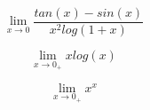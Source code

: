 \begin{subtask}
    \[\lim_{x\to 0}\frac{tan(x)-sin(x)}{x^2log(1+x)}\]
\end{subtask}
\begin{solution}
        
\end{solution}
    
\begin{minipage}[t]{0.49\textwidth}
    \begin{subtask}
        \[\lim_{x\to 0_+}xlog(x)\]
    \end{subtask}
    \begin{solution}
        
    \end{solution}
\end{minipage} %
\begin{minipage}[t]{0.49\textwidth}
    \begin{subtask}
        \[\lim_{x\to0_+}x^x\]
    \end{subtask}
    \begin{solution}
        
    \end{solution}
\end{minipage}